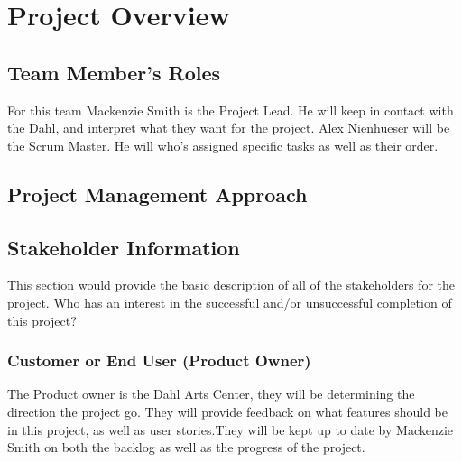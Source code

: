 

\chapter{Project Overview}



\section{Team Member's Roles}
For this team Mackenzie Smith is the Project Lead. He will keep in contact with the Dahl, and interpret what they want for the project. Alex Nienhueser will be the Scrum Master. He will who's assigned specific tasks as well as their order.

\section{Project  Management Approach}


\section{ Stakeholder Information}
This section would provide the basic description of all of the stakeholders for 
the project.  Who has an interest in the successful and/or unsuccessful completion 
of this project? 


\subsection{Customer or End User (Product Owner)}
The Product owner is the Dahl Arts Center, they will be determining the direction the project go. They will provide feedback on what features should be in this project, as well as user stories.They will be kept up to date by Mackenzie Smith on both the backlog as well as the progress of the project.

